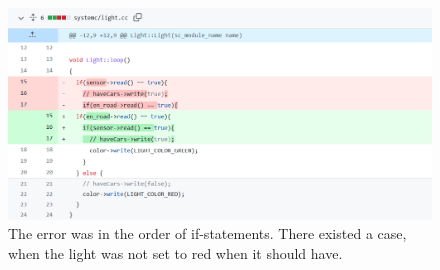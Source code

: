 \documentclass[10pt,bibliography=totocnumbered,listof=totocnumbered, footsepline, headsepline]{scrreprt}
\begin{document}
    \begin{figure}[H]
    	\centerline{\includegraphics[width=34pc]{git_diff.png}}
    	\caption{The error was in the order of if-statements. There existed a case, when the light was not set to red when it should have.}
    	\label{fig:git_diff}
    \end{figure}
    
\end{document}
